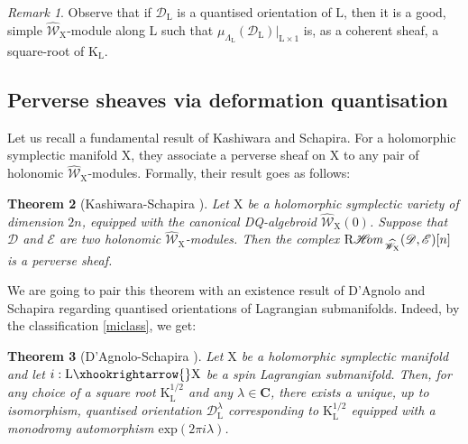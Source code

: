 \documentclass{article}
\theoremstyle{plain}
\newtheorem{theorem}{Theorem}[subsection]   %
\theoremstyle{definition}
\theoremstyle{remark}
\newtheorem{remark}[theorem]{Remark}
\newcommand{\mr}{\mathrm}
\newcommand{\Ww}{\widehat{\mathscr{W}}_{\mr{X}}}
\newcommand{\C}{\mathbf C}
\newcommand{\3}{\vspace{3mm}}
\newcommand{\2}{\vspace{2mm}}
\newcommand{\1}{\vspace{1mm}}
\newcommand*{\shom}{\mathscr{H}\text{\kern -3pt {\it{om}}}\,}
\begin{document}
\2
\begin{remark}
Observe that if $\mathscr{D}_\mr{L}$ is a quantised orientation of $\mr{L}$, then it is a good, simple $\widehat{\mathscr{W}}_\mr{X}$-module along $\mr{L}$ such that $\mu_{\Lambda_\mr{L}}(\mathscr{D}_\mr{L})|_{\mr{L}\times 1}$ is, as a coherent sheaf, a square-root of $\mr{K}_\mr{L}$.
\end{remark}
\subsection{Perverse sheaves via deformation quantisation}
Let us recall a fundamental result of Kashiwara and Schapira. For a holomorphic symplectic manifold $\mr{X}$, they associate a perverse sheaf on $\mr{X}$ to any pair of holonomic $\Ww$-modules. Formally, their result goes as follows:
\2
\begin{theorem}[Kashiwara-Schapira \cite{10.2307/40068123}]\label{perv}
 Let $\mr X$ be a holomorphic symplectic variety of dimension $2n$, equipped with the canonical DQ-algebroid $\widehat{\mathscr{W}}_\mr{X}(0)$. Suppose that $\mathscr{D}$ and $\mathscr{E}$ are two holonomic $\widehat{\mathscr{W}}_\mr{X}$-modules. Then the complex $\mr{R}\shom_{\Ww}(\mathscr{D},\mathscr{E})[n]$ is a perverse sheaf.
\end{theorem}
We are going to pair this theorem with an existence result of D'Agnolo and Schapira regarding quantised orientations of Lagrangian submanifolds. Indeed, by the classification \cref{miclass}, we get:
\2
\begin{theorem}[D'Agnolo-Schapira \cite{MR2331247}]\label{existsimplehol}
 Let $\mr{X}$ be a holomorphic symplectic manifold and let $i : \mr{L} \xhookrightarrow{} \mr{X}$ be a spin Lagrangian submanifold. Then, for any choice of a square root $\mr{K}_\mr{L}^{1/2}$ and any $\lambda \in \C$, there exists a unique, up to isomorphism, quantised orientation $\mathscr{D}^{\lambda}_\mr{L}$ corresponding to $\mr{K}_\mr{L}^{1/2}$ equipped with a monodromy automorphism $\mr{exp}(2\pi i \lambda)$.
\end{theorem}
\2
\end{document}
